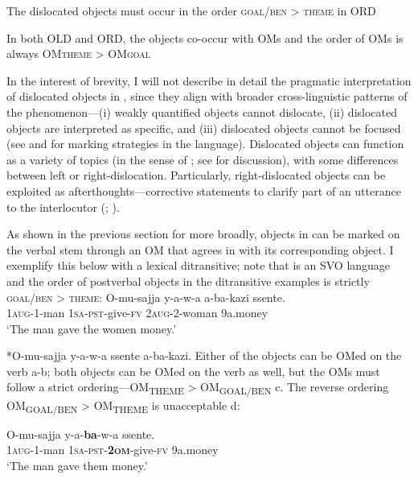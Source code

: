 \documentclass[output=paper
,newtxmath
,modfonts
,nonflat]{langsci/langscibook}
\begin{document}
\ex\label{ex:ranero:7bii}  The dislocated objects must occur in the order \textsc{goal/ben > theme} in ORD

\ex\label{ex:ranero:7biii}  In both OLD and ORD, the objects co-occur with OMs and the order of OMs is always OM\textsc{theme} > OM\textsc{goal}
\z
\z
\z

In the interest of brevity, I will not describe in detail the pragmatic interpretation of dislocated objects in , since they align with broader cross-linguistic patterns of the phenomenon—(i) weakly quantified objects cannot dislocate, (ii) dislocated objects are interpreted as specific, and (iii) dislocated objects cannot be focused (see \citealt{Hyman1993} and \citealt{vanderwal2016} for  marking strategies in the language). Dislocated objects can function as a variety of topics (in the sense of \citealt{Reinhart1981}; see \citealt{ranero2015} for discussion), with some differences between left or right-dislocation. Particularly, right-dislocated objects can be exploited as afterthoughts—corrective statements to clarify part of an utterance to the interlocutor (\citealt{grosz1998}; \citealt{Villalba2000}). 

As shown in the previous section for  more broadly, objects in  can be marked on the verbal stem through an OM that agrees in  with its corresponding object. I exemplify this below with a lexical ditransitive; note that  is an SVO language and the order of postverbal objects in the ditransitive examples is strictly \textsc{goal/ben > theme}:
\ea\label{ex:ranero:8}
\ea\label{ex:ranero:8a}
\gll O-mu-sajja    y-a-w-a          a-ba-kazi   ssente.\\
\textsc{1aug-}1-man \textsc{1sa-pst}{}-give-\textsc{fv} 2\textsc{aug}{}-2-woman 9a.money\\
\glt ‘The man gave the women money.’

\ex\label{ex:ranero:8b}*O-mu-sajja y-a-w-a ssente a-ba-kazi.
\z
\z
Either of the objects can be OMed on the verb a-b; both objects can be OMed on the verb as well, but the OMs must follow a strict ordering—OM\textsubscript{THEME} > OM\textsubscript{GOAL/BEN} c. The reverse ordering OM\textsubscript{GOAL/BEN} >\textsubscript{} OM\textsubscript{THEME} is unacceptable d:

\ea\label{ex:ranero:9}
\ea\label{ex:ranero:9a}
\gll O-mu-sajja    y-a-\textbf{ba}{}-w-a                  ssente.\\
1\textsc{aug}{}-1-man \textsc{1sa-pst-}\textbf{\textsc{2om}}{}-give-\textsc{fv} 9a.money\\
\glt ‘The man gave them money.’
\end{document}
